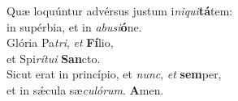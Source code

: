 \evenverse Quæ loquúntur advérsus justum i\textit{ni}\textit{qui}\textbf{tá}tem:~\*\\
\evenverse in supérbia, et in \textit{a}\textit{bu}\textit{si}\textbf{ó}ne.\\
\oddverse Glória Pa\textit{tri}, \textit{et} \textbf{Fí}lio,~\*\\
\oddverse et Spi\textit{rí}\textit{tu}\textit{i} \textbf{San}cto.\\
\evenverse Sicut erat in princípio, et \textit{nunc}, \textit{et} \textbf{sem}per,~\*\\
\evenverse et in sǽcula sæ\textit{cu}\textit{ló}\textit{rum}. \textbf{A}men.\\

